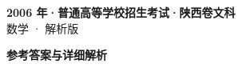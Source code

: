 \documentclass[zihao=-4, a4paper]{ctexart}
\begin{document}
\begin{center}
  {\Large\bfseries 2006 年·普通高等学校招生考试·陕西卷文科}\\[4pt]
  {\large 数学 · 解析版}
\end{center}
\medskip
{}

\clearpage
{}
\begin{center}{\Large\bfseries 参考答案与详细解析}\end{center}
\medskip

\end{document}
